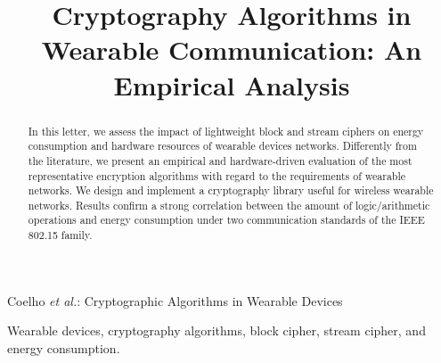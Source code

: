 \documentclass[journal]{IEEEtran}
\begin{document}
\title{Cryptography Algorithms in Wearable %
Communication: An Empirical Analysis}

\vspace{-2.0cm}




%
{Coelho \MakeLowercase{\textit{et al.}}: Cryptographic Algorithms in Wearable Devices}


\maketitle
{}

\begin{abstract}
%
In this letter, we assess the impact of lightweight block and stream ciphers on energy consumption and hardware resources of wearable devices networks. Differently from the literature, we present an empirical and hardware-driven evaluation of the most representative encryption algorithms with regard to the requirements of wearable networks. We design and implement a cryptography library useful for wireless wearable networks. Results confirm a strong correlation between the amount of logic/arithmetic operations and energy consumption under two communication standards of the IEEE 802.15 family. 
\end{abstract}

\begin{IEEEkeywords}
Wearable devices, cryptography algorithms, block cipher, stream cipher, and energy consumption. 
\vspace{-0.3cm}
\end{IEEEkeywords}
\end{document}

